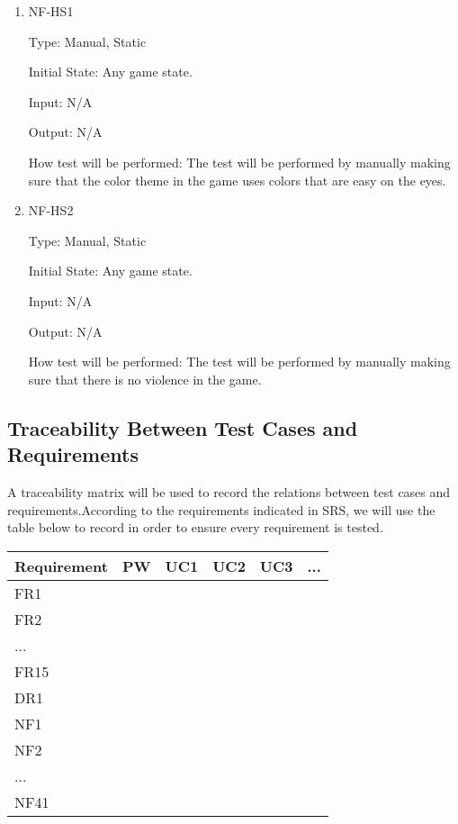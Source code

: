 \documentclass[12pt, titlepage]{article}
\begin{document}
\begin{enumerate}

\item{NF-HS1\\}

Type: Manual, Static
					
Initial State: Any game state.
					
Input: N/A
					
Output: N/A
					
How test will be performed: The test will be performed by manually making sure that the color theme in the game uses colors that are easy on the eyes.

\item{NF-HS2\\}

Type: Manual, Static
					
Initial State: Any game state.
					
Input: N/A
					
Output: N/A
					
How test will be performed: The test will be performed by manually making sure that there is no violence in the game.

\end{enumerate}

\subsection{Traceability Between Test Cases and Requirements}
A traceability matrix will be used to record the relations between test cases and requirements.According to the requirements indicated in SRS, we will use the table below to record in order to ensure every requirement is tested.
\begin{table}[htp]
\begin{tabular}{|l|l|l|l|l|l|}
\hline
Requirement & PW                & UC1      & UC2     & UC3     & ...     \\ \hline
FR1         & \multirow{9}{*}{ } & \multicolumn{4}{l|}{\multirow{9}{*}{}} \\ \cline{1-1}
FR2         &                   & \multicolumn{4}{l|}{}                  \\ \cline{1-1}
...         &                   & \multicolumn{4}{l|}{}                  \\ \cline{1-1}
FR15        &                   & \multicolumn{4}{l|}{}                  \\ \cline{1-1}
DR1         &                   & \multicolumn{4}{l|}{}                  \\ \cline{1-1}
NF1         &                   & \multicolumn{4}{l|}{}                  \\ \cline{1-1}
NF2         &                   & \multicolumn{4}{l|}{}                  \\ \cline{1-1}
...         &                   & \multicolumn{4}{l|}{}                  \\ \cline{1-1}
NF41        &                   & \multicolumn{4}{l|}{}                  \\ \hline
\end{tabular}
\end{table}
\end{document}

